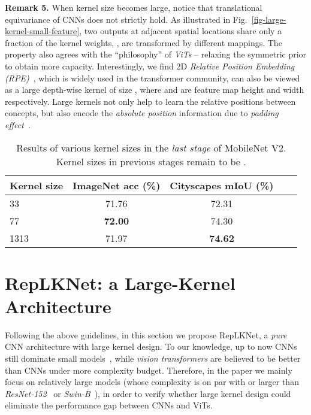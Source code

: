 \documentclass[10pt,twocolumn,letterpaper]{article}
\begin{document}
	\noindent \textbf{Remark 5.} 
	When kernel size becomes large, notice that translational equivariance of CNNs does not strictly hold. As illustrated in Fig.~\ref{fig-large-kernel-small-feature}, two outputs at adjacent spatial locations share only a fraction of the kernel weights, \ie, are transformed by different mappings. The property also agrees with the ``philosophy'' of \emph{ViTs} -- relaxing the symmetric prior to obtain more capacity. Interestingly, we find 2D \emph{Relative Position Embedding (RPE)}~\cite{shaw2018self,bello2019attention}, which is widely used in the transformer community, can also be viewed as a large depth-wise kernel of size , where  and  are feature map height and width respectively. Large kernels not only help to learn the relative positions between concepts, but also encode the \emph{absolute position} information due to \emph{padding effect}~\cite{kayhan2020translation}. 
	
	\begin{table}
		\caption{Results of various kernel sizes in the \emph{last stage} of MobileNet V2. Kernel sizes in previous stages remain to be .}
		\label{table-mob2-smallfeature}
		\vspace{-0.2in}
		\begin{center}
			\small
			\begin{tabular}{lcccc}
				\hline
				Kernel size		& ImageNet acc (\%)	&	Cityscapes mIoU (\%)	\\
				\hline
				33		&	71.76				&	72.31	\\
				77		&	\textbf{72.00}				&	74.30	\\
				1313	&	71.97				&	\textbf{74.62}	\\		
				\hline
			\end{tabular}
			
		\end{center}
		\vspace{-0.2in}
	\end{table}
	
	
	\section{RepLKNet: a Large-Kernel Architecture}
	\label{sec:arch}
	Following the above guidelines, in this section we propose RepLKNet, a \emph{pure} CNN architecture with large kernel design. To our knowledge, up to now CNNs still dominate small models~\cite{zhang2021collaboration,zhang2021basisnet}, while \emph{vision transformers} are believed to be better than CNNs under more complexity budget. Therefore, in the paper we mainly focus on relatively large models (whose complexity is on par with or larger than \emph{ResNet-152}~\cite{he2016deep} or \emph{Swin-B}~\cite{swin}), in order to verify whether large kernel design could eliminate the performance gap between CNNs and ViTs. 
	
\end{document}
